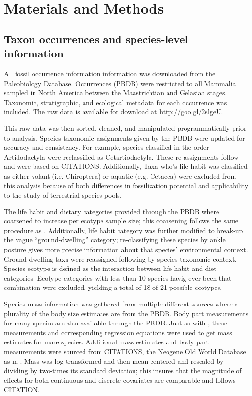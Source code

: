 \documentclass[12pt,letterpaper]{article}
\begin{document}
\section*{Materials and Methods}

\subsection*{Taxon occurrences and species-level information}
All fossil occurrence information information was downloaded from the Paleobiology Database. Occurrences (PBDB) were restricted to all Mammalia sampled in North America between the Maastrichtian and Gelasian stages. Taxonomic, stratigraphic, and ecological metadata for each occurrence was included. The raw data is available for download at \url{http://goo.gl/2slgeU}.

This raw data was then sorted, cleaned, and manipulated programmatically prior to analysis. Species taxonomic assignments given by the PBDB were updated for accuracy and consistency. For example, species classified in the order Artidodactyla were reclassified as Cetartiodactyla. These re-assignments follow \citet{Smits2015} and were based on CITATIONS. Additionally, Taxa who's life habit was classified as either volant (i.e. Chiroptera) or aquatic (e.g. Cetacea) were excluded from this analysis because of both differences in fossilization potential and applicability to the study of terrestrial species pools.

The life habit and dietary categories provided through the PBDB where coarsened to increase per ecotype sample size; this coarsening follows the same procedure as \citet{Smits2015}. Additionally, life habit category was further modified to break-up the vague ``ground-dwelling'' category; re-classifying these species by ankle posture gives more precise information about that species' environmental context. Ground-dwelling taxa were reassigned following \citet{Carrano1997} by species taxonomic context. Species ecotype is defined as the interaction between life habit and diet categories. Ecotype categories with less than 10 species havig ever been that combination were excluded, yielding a total of 18 of 21 possible ecotypes. %

Species mass information was gathered from multiple different sources where a plurality of the body size estimates are from the PBDB. Body part measurements for many species are also available through the PBDB. Just as with \citet{Smits2015}, these measurements and corresponding regression equations were used to get mass estimates for more species. Additional mass estimates and body part measurements were sourced from CITATIONS, the Neogene Old World Database as in \citet{Smits2015}. Mass was log-transformed and then mean-centered and rescaled by dividing by two-times its standard deviation; this insures that the magnitude of effects for both continuous and discrete covariates are comparable and follows CITATION. %
\end{document}
